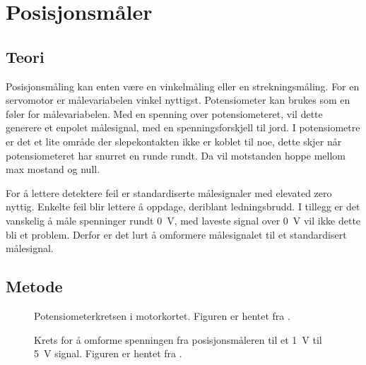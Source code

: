 \section{Posisjonsmåler}
\label{sec:pos_måler}

\subsection{Teori}




Posisjonsmåling kan enten være en vinkelmåling eller en strekningsmåling. For en servomotor er målevariabelen vinkel nyttigst. Potensiometer kan brukes som en føler for målevariabelen. Med en spenning over potensiometeret, vil dette generere et enpolet målesignal, med en spenningsforskjell til jord. I potensiometre er det et lite område der slepekontakten ikke er koblet til noe, dette skjer når potensiometeret har snurret en runde rundt.
Da vil motstanden hoppe mellom max mostand og null.

For å lettere detektere feil er standardiserte målesignaler med elevated zero nyttig. Enkelte feil blir lettere å oppdage, deriblant ledningsbrudd. I tillegg er det vanskelig å måle spenninger rundt \SI{0}{\volt}, med laveste signal over \SI{0}{\volt} vil ikke dette bli et problem. Derfor er det lurt å omformere målesignalet til et standardisert målesignal.






\subsection{Metode}

\begin{figure}[t]
    \centering
    
    \caption{Potensiometerkretsen i motorkortet. Figuren er hentet fra \cite{AnalogMotorlabbOppgaver}.}
    \label{fig:posisjon_maler_potmeter}
\end{figure}

\begin{figure}[h!]
    \centering
    
    \caption{Krets for å omforme spenningen fra posisjonsmåleren til et \SI{1}{\volt} til \SI{5}{\volt} signal. Figuren er hentet fra \cite{AnalogMotorlabbOppgaver}.}
    \label{fig:krets_posisjons_maler}
\end{figure}

